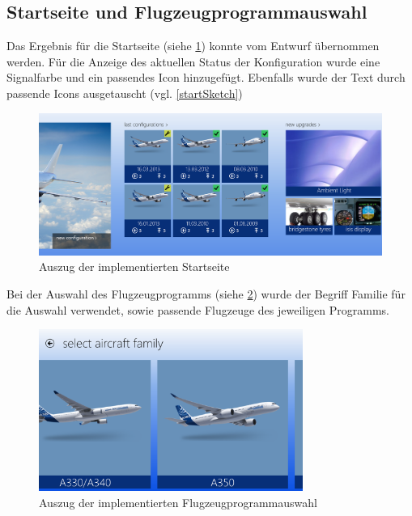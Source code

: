 \subsection{Startseite und Flugzeugprogrammauswahl}
Das Ergebnis für die Startseite (siehe \ref{startScreenImpl}) konnte vom Entwurf übernommen werden. Für die Anzeige des aktuellen Status der Konfiguration wurde eine Signalfarbe und ein passendes Icon hinzugefügt. Ebenfalls wurde der Text durch passende Icons ausgetauscht (vgl. \ref{startSketch}) 
\begin{figure}[H]
\centering
\includegraphics[width=\hsize]{images/impl/start_screen_impl}
\caption{Auszug der implementierten Startseite}
\label{startScreenImpl}
\end{figure}
Bei der Auswahl des Flugzeugprogramms (siehe \ref{aircraftProgrammImpl}) wurde der Begriff Familie für die Auswahl verwendet, sowie passende Flugzeuge des jeweiligen Programms.
\begin{figure}[H]
\centering
\includegraphics[height=200px]{images/impl/select_aircraft_family_impl}
\caption{Auszug der implementierten Flugzeugprogrammauswahl}
\label{aircraftProgrammImpl}
\end{figure}

